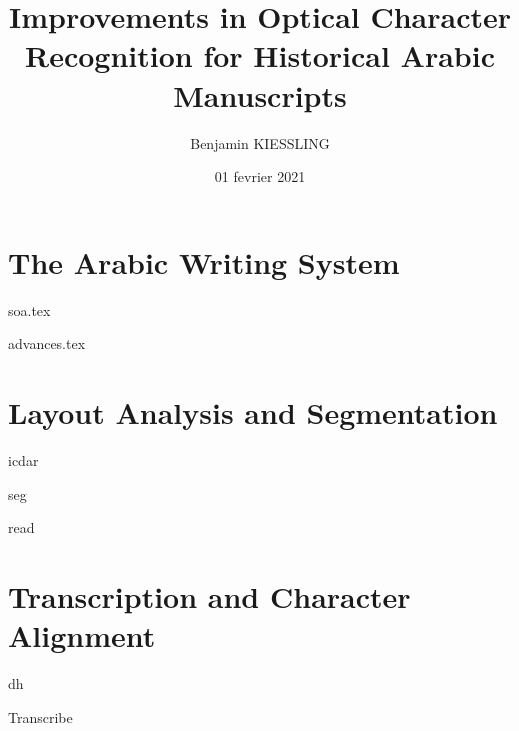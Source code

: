 \documentclass[a4paper, 12pt]{book}
\title{Improvements in Optical Character Recognition for Historical Arabic Manuscripts}
\author{Benjamin KIESSLING}
\institute{École Pratique des autes Études}
\date{01 fevrier 2021}
\begin{document}
\maketitle{}

\frontmatter

\cleardoublepage

\cleardoublepage


\tableofcontents
\listoffigures
\listoftables

\mainmatter
\begin{refsection}

\printbibliography[heading=subbibliography]
\end{refsection}
\cleardoublepage
\part{The Arabic Writing System}
\begin{refsection}

\printbibliography[heading=subbibliography]
\end{refsection}
\begin{refsection}
{soa.tex}
\printbibliography[heading=subbibliography]
\end{refsection}
\begin{refsection}
{advances.tex}
\printbibliography[heading=subbibliography]
\end{refsection}
\part{Layout Analysis and Segmentation}
\label{part:la}
\begin{refsection}
{icdar}
\printbibliography[heading=subbibliography]
\end{refsection}
\begin{refsection}
{seg}
\printbibliography[heading=subbibliography]
\end{refsection}
\cleardoublepage
\begin{refsection}
{read}
\printbibliography[heading=subbibliography]
\end{refsection}

\part{Transcription and Character Alignment}
\cleardoublepage
\begin{refsection}
{dh}
\printbibliography[heading=subbibliography]
\end{refsection}
\begin{refsection}
{Transcribe}
\printbibliography[heading=subbibliography]
\end{refsection}
\end{document}
